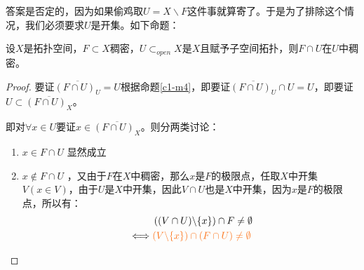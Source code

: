 \documentclass[lang=cn,10pt,device=pad]{elegantbook}
\newcommand{\tl}[1]{\textcolor{myor}{#1}}
\newcommand{\dkh}[1]{\{#1\}}
\newcommand{\xkh}[1]{\left(#1\right)}
\newcommand{\chadiao}{\backslash}
\begin{document}
答案是否定的，因为如果偷鸡取$U = X\chadiao F$这件事就算寄了。于是为了排除这个情况，我们必须要求$U$是开集。如下命题：
\begin{proposition}
		设$X$是拓扑空间，$F\subset X$稠密，$U\subset_{open} X$是$X$且赋予子空间拓扑，则$F\cap U$在$U$中稠密。
\end{proposition}
\begin{proof}
	要证$\overline{(F\cap U)_{U}} = U$根据命题\ref{c1-m4}，即要证$\overline{(F\cap U)_{U}}\cap U = U$，即要证$U\subset \overline{(F\cap U)_{X}}$。
	
	即对$\forall x\in U$要证$x\in \overline{(F\cap U)_{X}}$。则分两类讨论：
	\begin{enumerate}
		\item $x\in F\cap U$ 显然成立
		\item $x\notin F\cap U$ ，又由于$F$在$X$中稠密，那么$x$是$F$的极限点，\tl{任取$X$中开集$V(x\in V)$}，由于$U$是$X$中开集，因此$V\cap U$也是$X$中开集，因为$x$是$F$的极限点，所以有：
		\begin{equation*}
			\begin{aligned}
				&\xkh{(V\cap U)\chadiao \dkh{x}}\cap F \neq \emptyset\\
				\iff & \tl{(V\chadiao\dkh{x})\cap(F\cap U)\neq \emptyset}
			\end{aligned}
		\end{equation*}
	\end{enumerate}
\end{proof}
\end{document}
